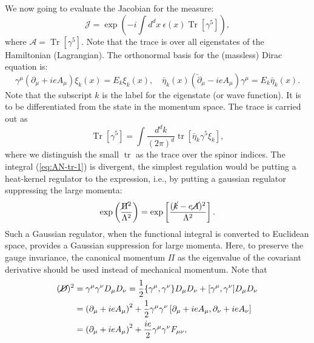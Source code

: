 \documentclass[aps,prb,superscriptaddress,nofootinbib]{revtex4}
\def \tr{\operatorname{tr}}
\def \Tr{\operatorname{Tr}}
\begin{document}
We now going to evaluate the Jacobian for the measure:
\begin{equation}
	\mathcal J = \exp\left(-i \int d^d x \ \epsilon(x) \Tr[\gamma^5] \right),
\end{equation}
where $\mathcal A = \Tr[\gamma^5]$.
Note that the trace is over all eigenstates of the Hamiltonian (Lagrangian).
The orthonormal basis for the (massless) Dirac equation is:
\begin{equation}
	\gamma^\mu (\partial_\mu + ie A_\mu ) \xi_k(x) = E_k \xi_k(x), \quad
	\bar\eta_k(x) \left(\overleftarrow\partial_\mu -ieA_\mu\right) \gamma^\mu = E_k \bar\eta_k(x).
\end{equation}
Note that the subscript $k$ is the label for the eigenstate (or wave function).
It is to be differentiated from the state in the momentum space.
The trace is carried out as
\begin{equation}\label{eq:AN-tr-1}
	\Tr\left[\gamma^5\right] 
	= \int \frac{d^d k}{(2\pi)^d} \tr\left[\bar\eta_k \gamma^5 \xi_k \right],
\end{equation}
where we distinguish the small $\tr$ as the trace over the spinor indices. 
The integral (\ref{eq:AN-tr-1}) is divergent, the simplest regulation would be putting a heat-kernel regulator to the expression, i.e., by putting a gaussian regulator suppressing the large momenta:
\begin{equation}
	\exp\left(\frac{\cancel{\Pi}^2}{\Lambda^2}\right)
	= \exp\left[\frac{(\cancel{k}-e\cancel{A})^2}{\Lambda^2}\right].
\end{equation}
Such a Gaussian regulator, when the functional integral is converted to Euclidean space, provides a Gaussian suppression for large momenta.
Here, to preserve the gauge invariance, the canonical momentum $\Pi$ as the eigenvalue of the covariant derivative should be used instead of mechanical momentum. 
Note that
\begin{equation}
\begin{aligned}
	(\cancel D)^2 &= \gamma^\mu \gamma^\nu {D}_\mu {D}_\nu 
	= \frac{1}{2} \{\gamma^\mu,\gamma^\nu\} {D}_\mu {D}_\nu + [\gamma^\mu,\gamma^\nu] {D}_\mu {D}_\nu \\
	&= \left(\partial_\mu+ie A_\mu \right)^2 + \frac{1}{2} \gamma^\mu \gamma^\nu \left[\partial_\mu+ie A_\mu, \partial_\nu+ie A_\nu \right] \\
	&= \left(\partial_\mu+ie A_\mu \right)^2 + \frac{ie}{2}\gamma^\mu \gamma^\nu F_{\mu\nu},
\end{aligned}
\end{equation}
\end{document}
